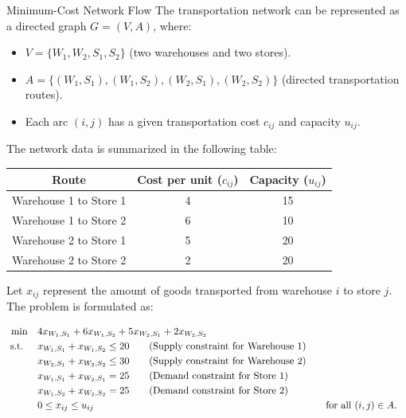 \begin{examplewithallcode}{Minimum-Cost Network Flow}
The transportation network can be represented as a directed graph \( G = (V, A) \), where:

\begin{itemize}
    \item \( V = \{ W_1, W_2, S_1, S_2 \} \) (two warehouses and two stores).
    \item \( A = \{(W_1, S_1), (W_1, S_2), (W_2, S_1), (W_2, S_2)\} \) (directed transportation routes).
    \item Each arc \( (i,j) \) has a given transportation cost \( c_{ij} \) and capacity \( u_{ij} \).
\end{itemize}

The network data is summarized in the following table:

    \begin{tabular}{|c|c|c|}
        \hline
        Route & Cost per unit ($c_{ij}$) & Capacity ($u_{ij}$) \\
        \hline
        Warehouse 1 to Store 1 & 4 & 15 \\
        Warehouse 1 to Store 2 & 6 & 10 \\
        Warehouse 2 to Store 1 & 5 & 20 \\
        Warehouse 2 to Store 2 & 2 & 20 \\
        \hline
    \end{tabular}
\par{}\label{tab:modeling-sums-continued-tab01}%



Let \( x_{ij} \) represent the amount of goods transported from warehouse \( i \) to store \( j \). The problem is formulated as:

\begin{align}
\min \quad & 4x_{W_1,S_1} + 6x_{W_1,S_2} + 5x_{W_2,S_1} + 2x_{W_2,S_2}\label{eq:example_objective} \\
    \mbox{ s.t. } \quad
    & x_{W_1,S_1} + x_{W_1,S_2} \leq 20   \tag{Supply constraint for Warehouse 1}\label{eq:supply1} \\
    & x_{W_2,S_1} + x_{W_2,S_2} \leq 30   \tag{Supply constraint for Warehouse 2}\label{eq:supply2} \\
    & x_{W_1,S_1} + x_{W_2,S_1} = 25   \tag{Demand constraint for Store 1}\label{eq:demand1} \\
    & x_{W_1,S_2} + x_{W_2,S_2} = 25   \tag{Demand constraint for Store 2}\label{eq:demand2} \\
    & 0 \leq x_{ij} \leq u_{ij} &&\quad \mbox{for all } (i,j) \in A.\label{eq:capacity_constraint_example}
\end{align}


\end{examplewithallcode}
